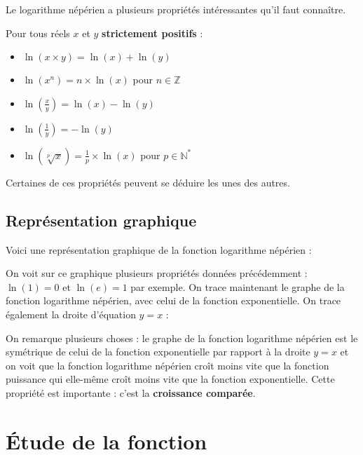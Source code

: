 	Le logarithme népérien a plusieurs propriétés intéressantes qu'il faut connaître.

	\begin{formula}[Formules]
		Pour tous réels $x$ et $y$ \textbf{strictement positifs} :
		\begin{itemize}
			\item $\ln(x \times y) = \ln(x) + \ln(y)$
			\item $\ln(x^n) = n \times \ln(x)$ pour $n \in \mathbb{Z}$
			\item $\displaystyle{\ln\left(\frac{x}{y}\right) = \ln(x) - \ln(y)}$
			\item $\displaystyle{\ln\left(\frac{1}{y}\right) = -\ln(y)}$
			\item $\displaystyle{\ln(\sqrt[p]{x}) = \frac{1}{p} \times \ln(x)}$ pour $p \in \mathbb{N}^*$
		\end{itemize}
	\end{formula}

	Certaines de ces propriétés peuvent se déduire les unes des autres.

	\subsection{Représentation graphique}
	\label{representation-graphique}

	Voici une représentation graphique de la fonction logarithme népérien :


	On voit sur ce graphique plusieurs propriétés données précédemment : $\ln(1) = 0$ et $\ln(e) = 1$ par exemple.
	On trace maintenant le graphe de la fonction logarithme népérien, avec celui de la fonction exponentielle. On trace également la droite d'équation $y = x$ :


	On remarque plusieurs choses : le graphe de la fonction logarithme népérien est le symétrique de celui de la fonction exponentielle par rapport à la
	droite $y = x$ et on voit que la fonction logarithme népérien croît moins vite que la fonction puissance qui elle-même croît moins vite que la fonction exponentielle. Cette propriété est importante : c'est la \textbf{croissance comparée}.

	\section{Étude de la fonction}


